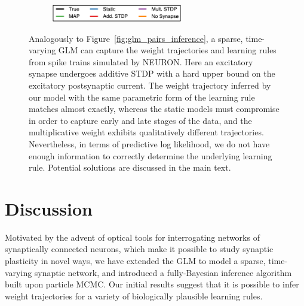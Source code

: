 \begin{figure}[t!]

  \begin{subfigure}[T]{\textwidth}
  \centering
  \includegraphics[height=2em]{figures/ch4/fig4_legend}    
  \end{subfigure}
  \caption[Synaptic weight trajectories for data generated from NEURON]{
    Analogously to Figure~\ref{fig:glm_pairs_inference}, a sparse,
    time-varying GLM can capture the weight trajectories and learning
    rules from spike trains simulated by NEURON. Here an excitatory
    synapse undergoes additive STDP with a hard upper bound on the
    excitatory postsynaptic current. The weight trajectory inferred by
    our model with the same parametric form of the learning rule
    matches almost exactly, whereas the static models must compromise
    in order to capture early and late stages of the data, and the
    multiplicative weight exhibits qualitatively different
    trajectories. Nevertheless, in terms of predictive log likelihood,
    we do not have enough information to correctly determine the
    underlying learning rule. Potential solutions are discussed in the
    main text.}
  \label{fig:pynn_pairs_inference}
\end{figure}


\section{Discussion}
Motivated by the advent of optical tools for interrogating networks of
synaptically connected neurons, which make it possible to study
synaptic plasticity in novel ways, we have extended the GLM to model a
sparse, time-varying synaptic network, and introduced a fully-Bayesian
inference algorithm built upon particle MCMC. Our initial results
suggest that it is possible to infer weight trajectories for a variety
of biologically plausible learning rules.

